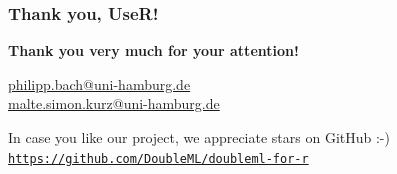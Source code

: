 \begin{frame}
\frametitle{Thank you, UseR!}

\begin{center}
\begin{large}
\textbf{Thank you very much for your attention!}
\end{large}
\end{center}
\vspace{20pt}
\begin{center}
\href{mailto:philipp.bach@uni-hamburg.de}{philipp.bach@uni-hamburg.de}\\
\href{mailto:malte.simon.kurz@uni-hamburg.de}{malte.simon.kurz@uni-hamburg.de}
\end{center}
\vspace{20pt}
\begin{center}
In case you like our project, we appreciate stars on GitHub :-) \\ \href{https://github.com/DoubleML/doubleml-for-r}{\texttt{https://github.com/DoubleML/doubleml-for-r}} 
\end{center}

\end{frame}


